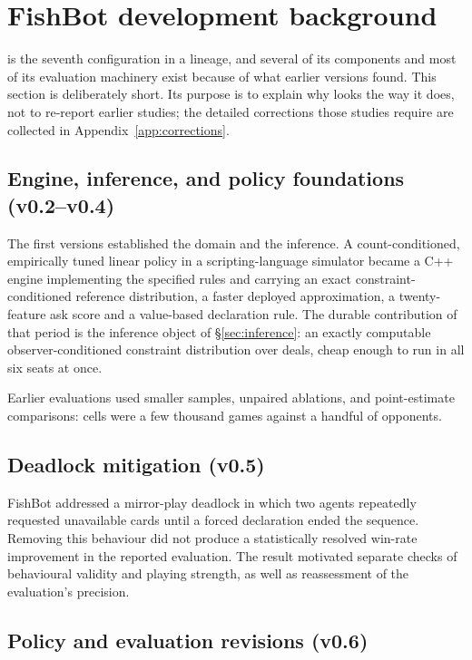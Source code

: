 \section{FishBot development background}
\label{sec:background}

\sestina{} is the seventh configuration in a lineage, and several of its components and most of its
evaluation machinery exist because of what earlier versions found. This section is deliberately
short. Its purpose is to explain why \sestina{} looks the way it does, not to re-report earlier
studies; the detailed corrections those studies require are collected in Appendix~\ref{app:corrections}.

\subsection{Engine, inference, and policy foundations (v0.2--v0.4)}
\label{sec:background-early}

The first versions established the domain and the inference. A count-conditioned, empirically tuned
linear policy in a scripting-language simulator became a C++ engine implementing the specified
rules and carrying an exact constraint-conditioned reference distribution, a faster deployed
approximation, a twenty-feature ask score and a value-based declaration rule. The durable
contribution of that period is the inference object of \S\ref{sec:inference}: an exactly computable
observer-conditioned constraint distribution over deals, cheap enough to run in all six seats at
once.

Earlier evaluations used smaller samples, unpaired ablations, and point-estimate comparisons: cells
were a few thousand games against a handful of opponents.

\subsection{Deadlock mitigation (v0.5)}
\label{sec:background-vfive}

FishBot \vfive{} addressed a mirror-play deadlock in which two agents repeatedly requested
unavailable cards until a forced declaration ended the sequence. Removing this behaviour did not
produce a statistically resolved win-rate improvement in the reported evaluation. The result
motivated separate checks of behavioural validity and playing strength, as well as reassessment of
the evaluation's precision.

\subsection{Policy and evaluation revisions (v0.6)}
\label{sec:background-vsix}

